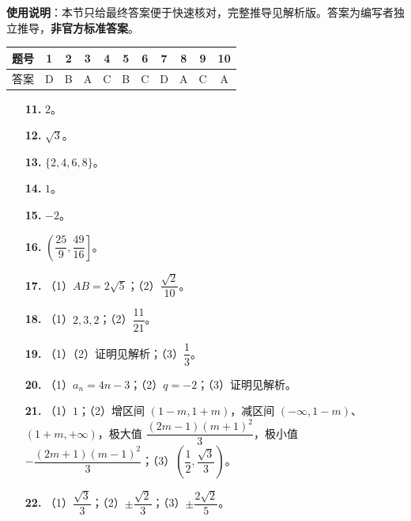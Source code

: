 
\begin{gknotice}
\textbf{使用说明}：本节只给最终答案便于快速核对，完整推导见解析版。答案为编写者独立推导，\textbf{非官方标准答案}。
\end{gknotice}

\begin{center}\begin{tabular}{ccccccccccc}
\toprule
题号 & 1 & 2 & 3 & 4 & 5 & 6 & 7 & 8 & 9 & 10 \\
\midrule
答案 & D & B & A & C & B & C & D & A & C & A \\
\bottomrule
\end{tabular}\end{center}

\begin{itemize}[leftmargin=2.6em]
  \item[\textbf{11.}] $2$。
  \item[\textbf{12.}] $\sqrt3$。
  \item[\textbf{13.}] $\{2,4,6,8\}$。
  \item[\textbf{14.}] $1$。
  \item[\textbf{15.}] $-2$。
  \item[\textbf{16.}] $\left(\dfrac{25}{9},\dfrac{49}{16}\right]$。
\end{itemize}

\begin{itemize}[leftmargin=2.6em]
  \item[\textbf{17.}] （1）$AB=2\sqrt5$；（2）$\dfrac{\sqrt2}{10}$。
  \item[\textbf{18.}] （1）$2,3,2$；（2）$\dfrac{11}{21}$。
  \item[\textbf{19.}] （1）（2）证明见解析；（3）$\dfrac13$。
  \item[\textbf{20.}] （1）$a_n=4n-3$；（2）$q=-2$；（3）证明见解析。
  \item[\textbf{21.}] （1）$1$；（2）增区间 $(1-m,1+m)$，减区间 $(-\infty,1-m)$、$(1+m,+\infty)$，极大值 $\dfrac{(2m-1)(m+1)^2}{3}$，极小值 $-\dfrac{(2m+1)(m-1)^2}{3}$；（3）$\left(\dfrac12,\dfrac{\sqrt3}{3}\right)$。
  \item[\textbf{22.}] （1）$\dfrac{\sqrt3}{3}$；（2）$\pm\dfrac{\sqrt2}{3}$；（3）$\pm\dfrac{2\sqrt2}{5}$。
\end{itemize}
